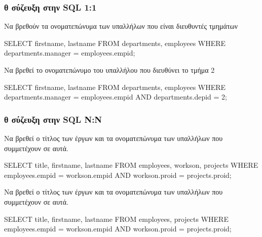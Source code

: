 \begin{frame}
\frametitle{θ σύζευξη στην {\en SQL} 1:1}
\begin{minipage}{\wE}
\begin{exampleblock}{\small Να βρεθούν τα ονοματεπώνυμα των υπαλλήλων που είναι διευθυντές τμημάτων}
\en
\begin{SQL}
  SELECT firstname, lastname
    FROM departments, employees
   WHERE departments.manager = employees.empid;
\end{SQL}
\el
\end{exampleblock}
\pause
\begin{exampleblock}{\small Να βρεθεί το ονοματεπώνυμο του υπαλλήλου που διευθύνει το τμήμα 2}
\en
\begin{SQL}
  SELECT firstname, lastname
    FROM departments, employees
   WHERE departments.manager = employees.empid
     AND departments.depid = 2;
\end{SQL}
\el
\end{exampleblock}
\end{minipage}
\end{frame}


\begin{frame}
\frametitle{θ σύζευξη στην {\en SQL} Ν:Ν}
\begin{minipage}{\wE}
\begin{exampleblock}{\small Να βρεθεί ο τίτλος των έργων και τα ονοματεπώνυμα των υπαλλήλων που συμμετέχουν σε αυτά.}
\en
\begin{SQL}
  SELECT title, firstname, lastname
    FROM employees, workson, projects
   WHERE employees.empid = workson.empid
     AND workson.proid = projects.proid;
\end{SQL}
\el
\end{exampleblock}
\pause
\begin{alertblock}{\small Να βρεθεί ο τίτλος των έργων και τα ονοματεπώνυμα των υπαλλήλων που συμμετέχουν σε αυτά.}
\en
\begin{SQL}
  SELECT title, firstname, lastname
    FROM employees, projects
   WHERE employees.empid = workson.empid
     AND workson.proid = projects.proid;
\end{SQL}
\el
\end{alertblock}
\end{minipage}
\end{frame}


